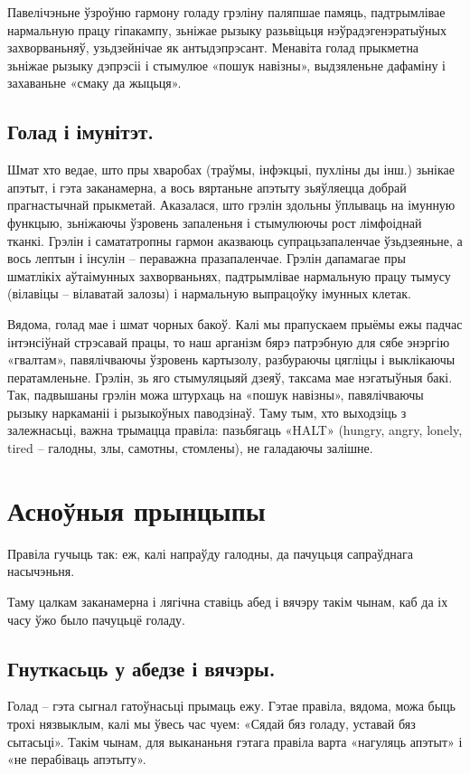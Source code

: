 Павелічэньне ўзроўню гармону голаду грэліну паляпшае памяць, падтрымлівае нармальную працу гіпакампу, зьніжае рызыку разьвіцьця нэўрадэгенэратыўных захворваньняў, узьдзейнічае як антыдэпрэсант. Менавіта голад прыкметна зьніжае рызыку дэпрэсіі і стымулюе «пошук навізны», выдзяленьне дафаміну і захаваньне «смаку да жыцьця».

\subsection{Голад і імунітэт.}
Шмат хто ведае, што пры хваробах (траўмы, інфэкцыі, пухліны ды інш.) зьнікае апэтыт, і гэта заканамерна, а вось вяртаньне апэтыту зьяўляецца добрай прагнастычнай прыкметай. Аказалася, што грэлін здольны ўплываць на імунную функцыю, зьніжаючы ўзровень запаленьня і стымулюючы рост лімфоіднай тканкі. Грэлін і самататропны гармон аказваюць супрацьзапаленчае ўзьдзеяньне, а вось лептын і інсулін – пераважна празапаленчае. Грэлін дапамагае пры шматлікіх аўтаімунных захворваньнях, падтрымлівае нармальную працу тымусу (вілавіцы – вілаватай залозы) і нармальную выпрацоўку імунных клетак.

Вядома, голад мае і шмат чорных бакоў. Калі мы прапускаем прыёмы ежы падчас інтэнсіўнай стрэсавай працы, то наш арганізм бярэ патрэбную для сябе энэргію «гвалтам», павялічваючы ўзровень картызолу, разбураючы цягліцы і выклікаючы ператамленьне. Грэлін, зь яго стымуляцыяй дзеяў, таксама мае нэгатыўныя бакі. Так, падвышаны грэлін можа штурхаць на «пошук навізны», павялічваючы рызыку наркаманіі і рызыкоўных паводзінаў. Таму тым, хто выходзіць з залежнасьці, важна трымацца правіла: пазьбягаць «HALT» (hungry, angry, lonely, tired – галодны, злы, самотны, стомлены), не галадаючы залішне.

\section{Асноўныя прынцыпы}

Правіла гучыць так: еж, калі напраўду галодны, да пачуцьця сапраўднага насычэньня.

Таму цалкам заканамерна і лягічна ставіць абед і вячэру такім чынам, каб да іх часу ўжо было пачуцьцё голаду.

\subsection{Гнуткасьць у абедзе і вячэры.}
Голад – гэта сыгнал гатоўнасьці прымаць ежу. Гэтае правіла, вядома, можа быць трохі нязвыклым, калі мы ўвесь час чуем: «Сядай бяз голаду, уставай бяз сытасьці». Такім чынам, для выкананьня гэтага правіла варта «нагуляць апэтыт» і «не перабіваць апэтыту».


